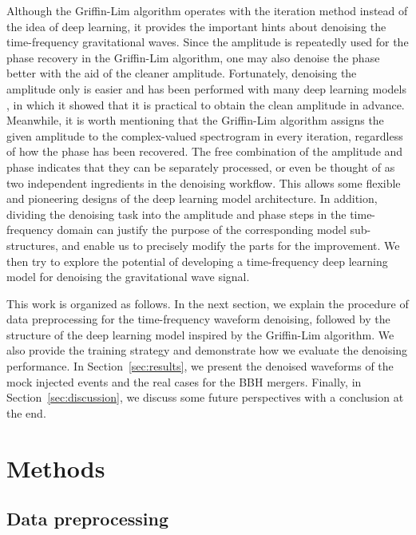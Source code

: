 \documentclass[preprint,12pt]{elsarticle}
\begin{document}
Although the Griffin-Lim algorithm operates with the iteration method instead of the idea of deep learning, it provides the important hints about denoising the time-frequency gravitational waves.
Since the amplitude is repeatedly used for the phase recovery in the Griffin-Lim algorithm, one may also denoise the phase better with the aid of the cleaner amplitude. 
Fortunately, denoising the amplitude only is easier and has been performed with many deep learning models \cite{kato2022validation, ghalsasi2023amplifying, jadhav2023towards, wang2024rapid}, in which it showed that it is practical to obtain the clean amplitude in advance.
Meanwhile, it is worth mentioning that the Griffin-Lim algorithm assigns the given amplitude to the complex-valued spectrogram in every iteration, regardless of how the phase has been recovered.
The free combination of the amplitude and phase indicates that they can be separately processed, or even be thought of as two independent ingredients in the denoising workflow.
This allows some flexible and pioneering designs of the deep learning model architecture.
In addition, dividing the denoising task into the amplitude and phase steps in the time-frequency domain can justify the purpose of the corresponding model sub-structures, and enable us to precisely modify the parts for the improvement.
We then try to explore the potential of developing a time-frequency deep learning model for denoising the gravitational wave signal.

This work is organized as follows. 
In the next section, we explain the procedure of data preprocessing for the time-frequency waveform denoising, followed by the structure of the deep learning model inspired by the Griffin-Lim algorithm. 
We also provide the training strategy and demonstrate how we evaluate the denoising performance. 
In Section~\ref{sec:results}, we present the denoised waveforms of the mock injected events and the real cases for the BBH mergers. 
Finally, in Section~\ref{sec:discussion}, we discuss some future perspectives with a conclusion at the end.

\section{Methods}\label{sec:methods}
\subsection{Data preprocessing}\label{sec:dapre}
\end{document}
